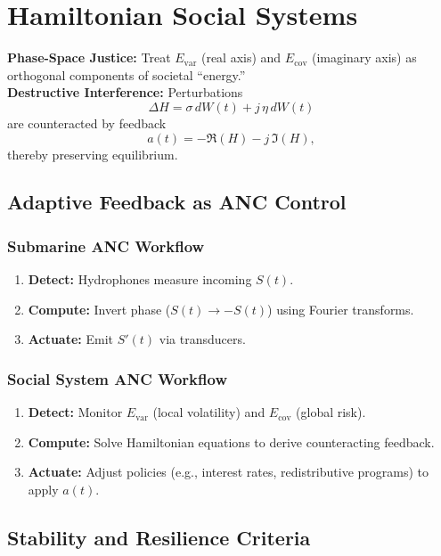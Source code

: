 \documentclass{article}
\theoremstyle{definition}
\begin{document}
\section{Hamiltonian Social Systems}
\textbf{Phase-Space Justice:} Treat \( E_{\text{var}} \) (real axis) and \( E_{\text{cov}} \) (imaginary axis) as orthogonal components of societal ``energy.''\\[1mm]
\textbf{Destructive Interference:} Perturbations
\[
\Delta H = \sigma\, dW(t) + j\, \eta\, dW(t)
\]
are counteracted by feedback
\[
a(t) = -\Re(H) - j\, \Im(H),
\]
thereby preserving equilibrium.

\subsection{Adaptive Feedback as ANC Control}

\subsubsection{Submarine ANC Workflow}
\begin{enumerate}
    \item \textbf{Detect:} Hydrophones measure incoming \( S(t) \).
    \item \textbf{Compute:} Invert phase (\( S(t) \rightarrow -S(t) \)) using Fourier transforms.
    \item \textbf{Actuate:} Emit \( S'(t) \) via transducers.
\end{enumerate}

\subsubsection{Social System ANC Workflow}
\begin{enumerate}
    \item \textbf{Detect:} Monitor \( E_{\text{var}} \) (local volatility) and \( E_{\text{cov}} \) (global risk).
    \item \textbf{Compute:} Solve Hamiltonian equations to derive counteracting feedback.
    \item \textbf{Actuate:} Adjust policies (e.g., interest rates, redistributive programs) to apply \( a(t) \).
\end{enumerate}

\subsection{Stability and Resilience Criteria}
\end{document}
